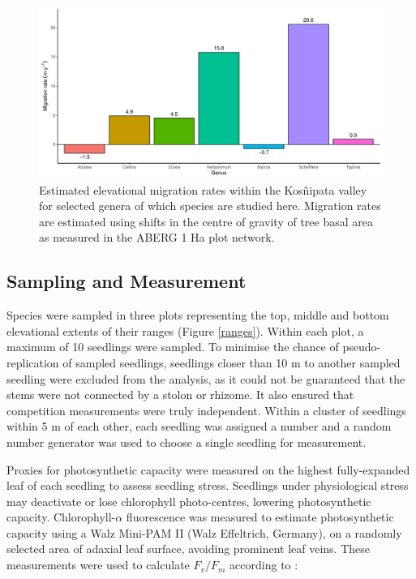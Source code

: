 \documentclass[a4paper, 11pt]{article}
\begin{document}
\begin{figure}[H]
\includegraphics[width=\textwidth]{mig}
\centering
\caption{Estimated elevational migration rates within the Kos\~{n}ipata valley for selected genera of which species are studied here. Migration rates are estimated using shifts in the centre of gravity of tree basal area as measured in the ABERG 1 Ha plot network.}
\label{mig}
\end{figure}


\subsection{Sampling and Measurement}
Species were sampled in three plots representing the top, middle and bottom elevational extents of their ranges (Figure \ref{ranges}). Within each plot, a maximum of 10 seedlings were sampled. To minimise the chance of pseudo-replication of sampled seedlings, seedlings closer than 10 m to another sampled seedling were excluded from the analysis, as it could not be guaranteed that the stems were not connected by a stolon or rhizome. It also ensured that competition measurements were truly independent. Within a cluster of seedlings within 5 m of each other, each seedling was assigned a number and a random number generator was used to choose a single seedling for measurement.

Proxies for photosynthetic capacity were measured on the highest fully-expanded leaf of each seedling to assess seedling stress. Seedlings under physiological stress may deactivate or lose chlorophyll photo-centres, lowering photosynthetic capacity. Chlorophyll-$\alpha$ fluorescence was measured to estimate photosynthetic capacity using a Walz Mini-PAM II (Walz Effeltrich, Germany), on a randomly selected area of adaxial leaf surface, avoiding prominent leaf veins. These measurements were used to calculate $F_v/F_m$ according to \citet{Genty1989}:
\end{document}
